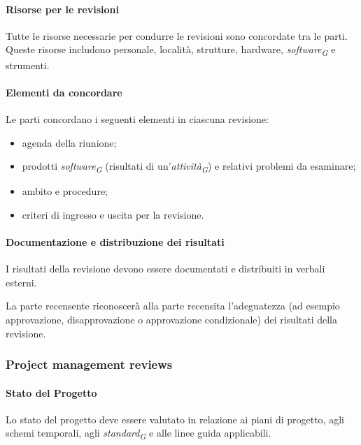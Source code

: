 \paragraph{Risorse per le revisioni}
Tutte le risorse necessarie per condurre le revisioni sono concordate tra le parti. Queste risorse includono personale, località, strutture, hardware, \textit{software}\textsubscript{\textit{G}} e strumenti. 

\paragraph{Elementi da concordare}
Le parti concordano i seguenti elementi in ciascuna revisione: 
\begin{itemize}
    \item 
        agenda della riunione;
    \item 
        prodotti \textit{software}\textsubscript{\textit{G}} (risultati di un'\textit{attività}\textsubscript{\textit{G}}) e relativi problemi da esaminare;
    \item 
        ambito e procedure;
    \item 
        criteri di ingresso e uscita per la revisione.
\end{itemize}


\paragraph{Documentazione e distribuzione dei risultati} 
I risultati della revisione devono essere documentati e distribuiti in verbali esterni. 

La parte recensente riconoscerà alla parte recensita l'adeguatezza (ad esempio approvazione, disapprovazione o approvazione condizionale) dei risultati della revisione. 

\subsubsection{Project management reviews}

\paragraph{Stato del Progetto}
Lo stato del progetto deve essere valutato in relazione ai piani di progetto, agli schemi temporali, agli \textit{standard}\textsubscript{\textit{G}} e alle linee guida applicabili. 

